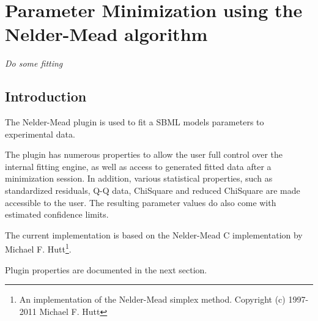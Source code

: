 \chapter*{Parameter Minimization using the Nelder-Mead algorithm}
\setcounter{chapter}{1}
\emph{Do some fitting}
\section{Introduction}
The Nelder-Mead plugin is used to fit a SBML models parameters to experimental data.

The plugin has numerous properties to allow the user full control over the internal fitting engine, as well as
access to generated fitted data after a minimization session. In addition, various statistical properties, such as standardized residuals, Q-Q data, ChiSquare and reduced ChiSquare are made accessible to the user. The resulting parameter values do also come with estimated confidence limits.

The current implementation is based on the Nelder-Mead C implementation by Michael F. Hutt\footnote{

 An implementation of the Nelder-Mead simplex method.
 Copyright (c) 1997-2011 Michael F. Hutt
}.


Plugin properties are documented in the next section.

